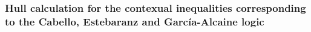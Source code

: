 \documentclass[%
 showpacs,
 showkeys,
 preprintnumbers,
 amsmath,amssymb,
 aps,
  pra,
  longbibliography,
 floatfix,
 ]{revtex4-1}
\begin{document}
%
%
%
%
%



\subsubsection{Hull calculation for the contexual inequalities corresponding to the Cabello, Estebaranz and Garc{\'{i}}a-Alcaine logic}
\end{document}
